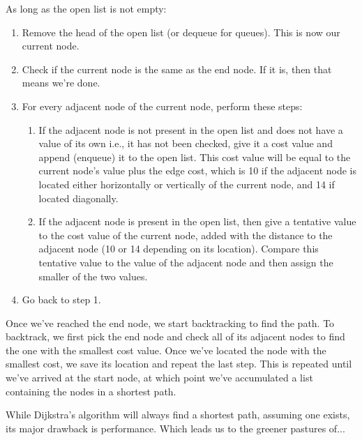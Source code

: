 \documentclass[12pt, a4paper]{article}
\begin{document}
As long as the open list is not empty:

\begin{enumerate}
	\item Remove the head of the open list (or dequeue for queues). This is now
	our current node.
	\item Check if the current node is the same as the end node. If it is, then
	that means we're done.
	\item For every adjacent node of the current node, perform these steps:
	\begin{enumerate}
		\item If the adjacent node is not present in the open list and does not
		have a value of its own i.e., it has not been checked, give it a cost
		value and append (enqueue) it to the open list. This cost value will be
		equal to the current node's value plus the edge cost, which is 10 if the
		adjacent node is located either horizontally or vertically of the current
		node, and 14 if located diagonally.
		\item If the adjacent node is present in the open list, then give a
		tentative value to the cost value of the current node, added with the
		distance to the adjacent node (10 or 14 depending on its location).
		Compare this tentative value to the value of the adjacent node and then
		assign the smaller of the two values.
	\end{enumerate}
	\item Go back to step 1.
\end{enumerate}

Once we've reached the end node, we start backtracking to find the path. To backtrack, we first
pick the end node and check all of its adjacent nodes to find the one with the smallest cost value. Once we've
located the node with the smallest cost, we save its location and repeat the last step. This is repeated until we've arrived
at the start node, at which point we've accumulated a list containing the nodes in a shortest path.

While Dijkstra's algorithm will always find a shortest path, assuming one exists, its
major drawback is performance. Which leads us to the greener pastures of...




\end{document}
